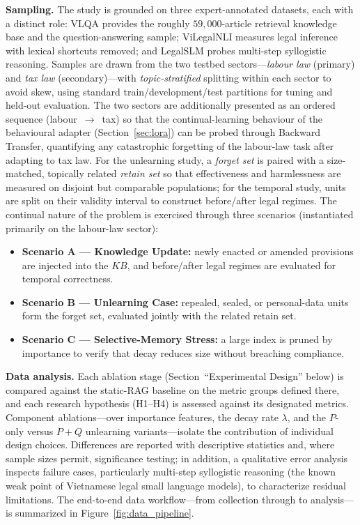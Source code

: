\textbf{Sampling.} The study is grounded on three expert-annotated datasets, each with a distinct role: VLQA \parencite{nguyen2025vlqacomprehensivelargehighquality} provides the roughly $59{,}000$-article retrieval knowledge base and the question-answering sample; ViLegalNLI \parencite{duong2026vilegalnlinaturallanguageinference} measures legal inference with lexical shortcuts removed; and LegalSLM \parencite{le-etal-2025-overview} probes multi-step syllogistic reasoning. Samples are drawn from the two testbed sectors---\emph{labour law} (primary) and \emph{tax law} (secondary)---with \emph{topic-stratified} splitting within each sector to avoid skew, using standard train/development/test partitions for tuning and held-out evaluation. The two sectors are additionally presented as an ordered sequence (labour~$\rightarrow$~tax) so that the continual-learning behaviour of the behavioural adapter (Section~\ref{sec:lora}) can be probed through Backward Transfer, quantifying any catastrophic forgetting of the labour-law task after adapting to tax law. For the unlearning study, a \emph{forget set} is paired with a size-matched, topically related \emph{retain set} so that effectiveness and harmlessness are measured on disjoint but comparable populations; for the temporal study, units are split on their validity interval to construct before/after legal regimes. The continual nature of the problem is exercised through three scenarios (instantiated primarily on the labour-law sector):
\begin{itemize}
    \item \textbf{Scenario A --- Knowledge Update:} newly enacted or amended provisions are injected into the $KB$, and before/after legal regimes are evaluated for temporal correctness.
    \item \textbf{Scenario B --- Unlearning Case:} repealed, sealed, or personal-data units form the forget set, evaluated jointly with the related retain set.
    \item \textbf{Scenario C --- Selective-Memory Stress:} a large index is pruned by importance to verify that decay reduces size without breaching compliance.
\end{itemize}

\textbf{Data analysis.} Each ablation stage (Section~``Experimental Design'' below) is compared against the static-RAG baseline on the metric groups defined there, and each research hypothesis (H1--H4) is assessed against its designated metrics. Component ablations---over importance features, the decay rate $\lambda$, and the $P$-only versus $P{+}Q$ unlearning variants---isolate the contribution of individual design choices. Differences are reported with descriptive statistics and, where sample sizes permit, significance testing; in addition, a qualitative error analysis inspects failure cases, particularly multi-step syllogistic reasoning (the known weak point of Vietnamese legal small language models), to characterize residual limitations. The end-to-end data workflow---from collection through to analysis---is summarized in Figure~\ref{fig:data_pipeline}.

